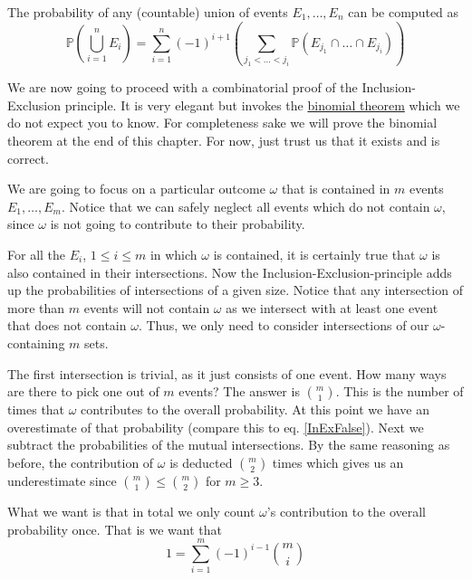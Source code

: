 \documentclass[a4paper,11pt,leqno]{report}
\begin{document}
\begin{Theorem}
The probability of any (countable) union of events $ E_{1}, \ldots, E_{n} $ can be computed as \\
$$ \mathbb{P} \left( \underset{i=1}{\overset{n}{\bigcup}} E_{i} \right) 
= \underset{i=1}{\overset{n}{\sum}} (-1)^{i+1} \left( \underset{j_{1}<\ldots<j_{i}}{\sum} 
\mathbb{P} \left(E_{j_{1}} \cap \ldots \cap E_{j_{i}} \right) \right)  $$
\end{Theorem}

We are now going to proceed with a combinatorial proof of the Inclusion-Exclusion principle. It is
very elegant but invokes the \href{https://en.wikipedia.org/wiki/Binomial_theorem}{binomial theorem}
which we do not expect you to know. For completeness sake we will prove the binomial theorem
at the end of this chapter. For now, just trust us that it exists and is correct.

We are going to focus on a particular outcome $ \omega $ that is contained in $ m $ events 
$ E_{1}, \ldots, E_{m} $. Notice that we can safely neglect all events which do not contain
$ \omega $, since $ \omega $ is not going to contribute to their probability. 

For all the $ E_{i} $, $ 1 \leq i \leq m $ in which $ \omega $ is contained, it is certainly true
that $ \omega $ is also contained in their intersections. Now the Inclusion-Exclusion-principle
adds up the probabilities of intersections of a given size. Notice that any intersection of more
than $ m $ events will not contain $ \omega $ as we intersect with at least one event that does not
contain $ \omega $. Thus, we only need to consider intersections of our $ \omega $-containing $ m $
sets.

The first intersection is trivial, as it just consists of one event. How many ways are there to pick
one out of $ m $ events? The answer is $ \binom{m}{1} $. This is the number of times that $ \omega $
contributes to the overall probability. At this point we have an overestimate of that probability 
(compare this to eq. \ref{InExFalse}). Next we subtract the probabilities of the mutual intersections.
By the same reasoning as before, the contribution of $ \omega $ is deducted $ \binom{m}{2} $ times
which gives us an underestimate since $ \binom{m}{1} \leq \binom{m}{2} $ for $ m \geq 3 $.

What we want is that in total we only count $ \omega $'s contribution to the overall probability once.
That is we want that
\begin{equation} \label{InExProofStep1}
1 = \underset{i=1}{\overset{m}{\sum}}(-1)^{i-1}\binom{m}{i}
\end{equation}
\end{document}
